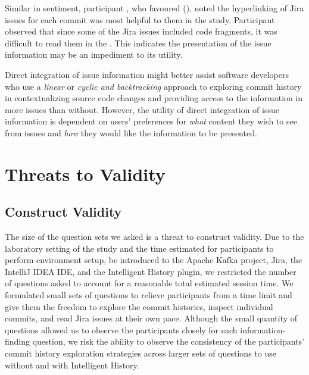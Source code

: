 Similar in sentiment, participant , who favoured (), noted the hyperlinking of Jira issues for each commit
was most helpful to them in the study.
Participant  observed that since some of the Jira issues 
included code fragments, it was difficult to read them in the .
This indicates the presentation of the issue information may be an impediment to its utility.

\begin{summary}[RQ3]
  Direct integration of issue information might better assist software developers 
  who use a \textit{linear} or \textit{cyclic and backtracking} approach to exploring commit history 
  in contextualizing source code changes and providing access to the information in more issues than without.
  However, the utility of direct integration of issue information is dependent on users' preferences 
  for \emph{what} content they wish to see from issues and \emph{how} they would like 
  the information to be presented.
\end{summary}


\section{Threats to Validity}

\subsection{Construct Validity}

The size of the question sets we asked is a threat to construct validity.
Due to the laboratory setting of the study and the time estimated for participants to perform environment setup,
be introduced to the Apache Kafka project, Jira, the IntelliJ IDEA IDE, and the Intelligent History plugin,
we restricted the number of questions asked to account for a reasonable total estimated session time.
We formulated small sets of questions to relieve participants from a time limit 
and give them the freedom to explore the commit histories, inspect individual commits, and read Jira issues at their own pace.
Although the small quantity of questions allowed us to observe the participants closely for each information-finding question,
we risk the ability to observe the consistency of the participants' commit history exploration strategies
across larger sets of questions to use without and with Intelligent History.

